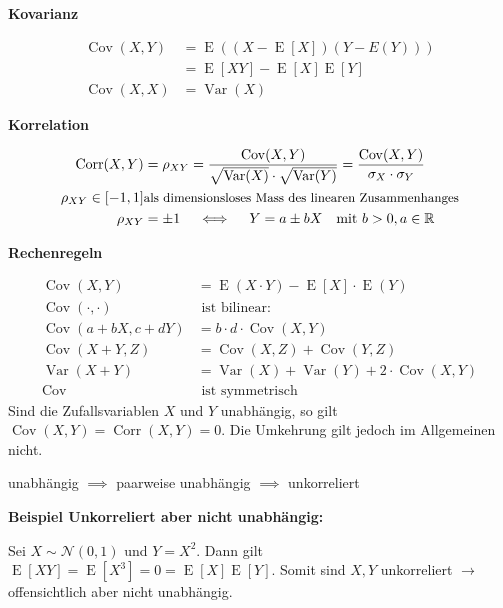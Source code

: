 \documentclass[25pt]{sciposter}
\newcommand{\R}{\mathbb{R}}
\newcommand{\Var}{\operatorname{Var}}
\newcommand{\E}{\operatorname{E}}
\newenvironment{method}[1]{\begin{mdframed}[backgroundcolor=blue!10,innertopmargin=15pt, innerbottommargin=15pt,nobreak=true]
		\textbf{#1 }
	}
	{ 
	\end{mdframed}
}
\newenvironment{thm}[1]{\begin{mdframed}[backgroundcolor=pink!20,innertopmargin=15pt, innerbottommargin=15pt, nobreak=true]
		\textbf{#1 }
	}
	{ 
	\end{mdframed}
}
\begin{document}
\begin{multicols}{3}
\begin{method}{Kovarianz}
	\begin{align*}	
	\operatorname{Cov}(X,Y) &= \E\left(\left(X-\E[X]\right)\left(Y-E(Y)\right)\right) \\ &= \E[XY]  - \E[X]\E[Y]\\
	\operatorname{Cov}(X,X) &= \Var(X)
	\end{align*}
\end{method}

\begin{method}{Korrelation}
	\begin{align*}
	\operatorname{Corr}(X,Y) &= \rho_{XY} = \frac{\operatorname{Cov}(X,Y)}{\sqrt{\Var(X)} \cdot \sqrt{\Var(Y)}}
	= \frac{\operatorname{Cov}(X,Y)}{\sigma_X\cdot\sigma_Y} \\
	\rho_{XY} \in [-1,1] &  \text{\small als dimensionsloses Mass des linearen Zusammenhanges} \\
	\rho_{XY} &=\pm 1 \quad \iff \quad Y = a\pm bX \quad \text{mit }b>0, a \in \R
	\end{align*}
\end{method}

\begin{thm}{Rechenregeln}
	\begin{align*}
	\operatorname{Cov}(X,Y) &= \E(X\cdot Y) - \E[X] \cdot \E(Y) \\
	\operatorname{Cov}(\cdot,\cdot) &\text{ ist bilinear:} \quad \\
	\operatorname{Cov}(a+bX,c+dY) &= b\cdot d \cdot \operatorname{Cov} (X,Y) \\
	\operatorname{Cov}(X+Y,Z) &= \operatorname{Cov}(X,Z)+\operatorname{Cov}(Y,Z) \\
	\Var(X+Y) &= \Var(X)+\Var(Y)+2 \cdot \operatorname{Cov}(X,Y) \\
	\operatorname{Cov} &\text{ ist symmetrisch}
	\end{align*}
	Sind die Zufallsvariablen $X$ und $Y$ unabhängig, so gilt $\operatorname{Cov}(X,Y) = \operatorname{Corr}(X,Y) = 0$.
	Die Umkehrung gilt jedoch im Allgemeinen nicht.
\end{thm}



\begin{mdframed}
	\centering
	{unabhängig $\implies$ paarweise unabhängig $\implies$ unkorreliert}
\end{mdframed}

\textbf{Beispiel Unkorreliert aber nicht unabhängig:}

Sei $X\sim \mathcal{N}(0,1)$ und $Y = X^2$. Dann gilt $\E[XY] = \E[X^3] = 0 = \E[X]\E[Y]$. Somit sind $X,Y$ unkorreliert $\rightarrow$ offensichtlich aber nicht unabhängig.






\end{multicols}
\end{document}
